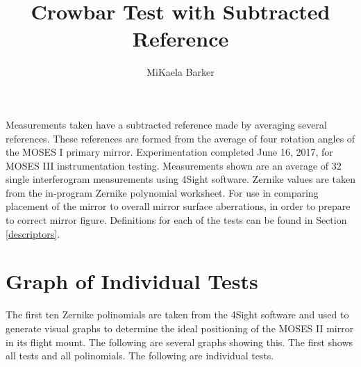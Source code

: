 \documentclass{article}
\title{Crowbar Test with Subtracted Reference}
\author{MiKaela Barker}
\begin{document}
\maketitle
Measurements taken have a subtracted reference made by averaging several references. These references are formed from the average of four rotation angles of the MOSES I primary mirror. Experimentation completed June 16, 2017, for MOSES III instrumentation testing. Measurements shown are an average of 32 single interferogram measurements using 4Sight software. Zernike values are taken from the in-program Zernike polynomial worksheet. For use in comparing placement of the mirror to overall mirror surface aberrations, in order to prepare to correct mirror figure. Definitions for each of the tests can be found in Section \ref{descriptors}. 

\section{Graph of Individual Tests}
The first ten Zernike polinomials are taken from the 4Sight software and used to generate visual graphs to determine the ideal positioning of the MOSES II mirror in its flight mount. The following are several graphs showing this. The first shows all tests and all polinomials. The following are individual tests.
\end{document}
